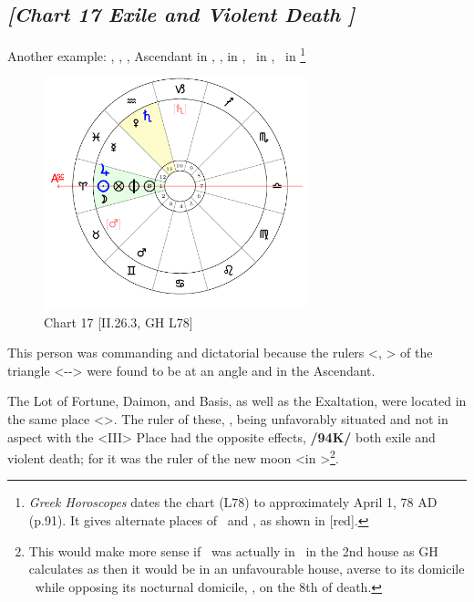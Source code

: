 \subsection*{\textit{[Chart 17 Exile and Violent Death ]}}

Another example: \Sun, \Moon, \Jupiter, Ascendant in \Aries, \Saturn, \Venus in \Aquarius, \Mars\, in \Gemini, \Mercury\, in \Pisces
\footnote{\textit{Greek Horoscopes} dates the chart (L78) to approximately April 1, 78 AD (p.91). It gives alternate places of \Mars\, and \Saturn, as shown in \textcolor{red!50}{[red]}.}

\clearpage
\begin{figure}
\centering
\vspace{-20pt}
\includegraphics[width=0.68\textwidth]{charts/2_26_3}
\caption{Chart 17 [II.26.3, GH L78]}
\label{fig:chart17}
\end{figure}

This person was commanding and dictatorial because the rulers <\Sun, \Jupiter> of the triangle <\Aries-\Leo-\Sagittarius> were found to be at an angle and in the Ascendant. 

The Lot of Fortune, Daimon, and Basis, as well as the Exaltation, were located in the same place <\Aries>. The ruler of these, \Mars, being unfavorably situated and not in aspect with the <III> Place had the opposite effects, \textbf{/94K/} both exile and violent death; for it was the ruler of the new moon <in \Aries>\footnote{This would make more sense if \Mars\, was actually in \Taurus\, in the 2nd house as GH calculates as then it would be in an unfavourable house, averse to its domicile \Aries\, while opposing its nocturnal domicile, \Scorpio, on the 8th of death.}.

